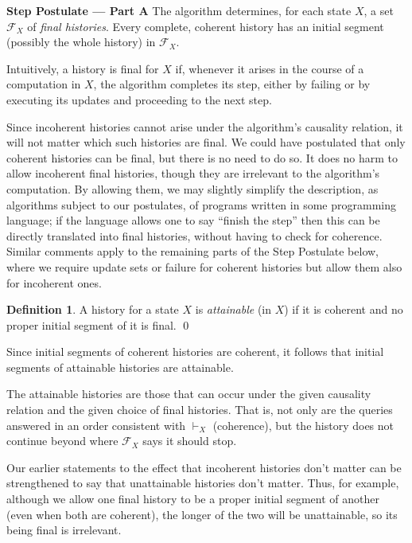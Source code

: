 \documentclass{LMCS}
\theoremstyle{definition}
\newtheorem{df}[thm]{Definition}
\newenvironment{unn}[1]{\bigskip\noindent\textbf{#1}\quad}{\par\bigskip}
\newcommand{\scr}[1]{\ensuremath{\mathcal {#1}}}
\begin{document}
\begin{unn}{Step Postulate --- Part A}
The algorithm determines, for each state $X$, a set $\scr F_X$ of
\emph{final histories}.  Every complete, coherent history has an
initial segment (possibly the whole history) in $\scr F_X$.
\end{unn}

Intuitively, a history is final for $X$ if, whenever it arises in the course
of a computation in $X$, the algorithm completes its step, either by
failing or by executing its updates and proceeding to the next step.

Since incoherent histories cannot arise under the algorithm's
causality relation, it will not matter which such histories are final.
We could have postulated that only coherent histories can be final,
but there is no need to do so.  It does no harm to allow incoherent
final histories, though they are irrelevant to the algorithm's
computation.  By allowing them, we may slightly simplify the
description, as algorithms subject to our postulates, of programs
written in some programming language; if the language allows one to
say ``finish the step'' then this can be directly translated into
final histories, without having to check for coherence.  Similar
comments apply to the remaining parts of the Step Postulate below,
where we require update sets or failure for coherent histories but
allow them also for incoherent ones.

\begin{df}   \label{att-def}
  A history for a state $X$ is \emph{attainable} (in $X$) if it
  is coherent and no proper initial segment of it is final.
\qed\end{df}

Since initial segments of coherent histories are coherent, it follows
that initial segments of attainable histories are attainable.

The attainable histories are those that can occur under the given
causality relation and the given choice of final histories.  That is,
not only are the queries answered in an order consistent with
$\vdash_X$ (coherence), but the history does not continue beyond where
$\scr F_X$ says it should stop.

Our earlier statements to the effect that incoherent histories don't
matter can be strengthened to say that unattainable histories don't
matter.  Thus, for example, although we allow one final history to be
a proper initial segment of another (even when both are coherent), the
longer of the two will be unattainable, so its being final is
irrelevant.
\end{document}
